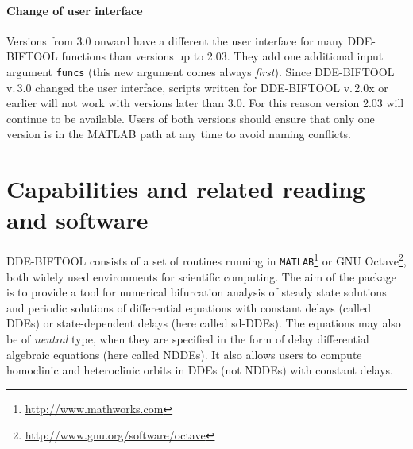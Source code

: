 \documentclass[10pt]{scrartcl}
\newcommand{\DDEBIFCODE}{\textsc{DDE-BIFTOOL}}
\newcommand{\blist}[1]{\mbox{\lstinline!#1!}}
\begin{document}
\paragraph{Change of user interface}
Versions from 3.0 onward have a different the user interface for many
\DDEBIFCODE{} functions than versions up to 2.03. They add one
additional input argument \blist{funcs} (this new argument comes
always \emph{first}).  Since \DDEBIFCODE{} v.\,3.0 changed the user
interface, scripts written for \DDEBIFCODE{} v.\,2.0x or earlier will
not work with versions later than 3.0. For this reason version 2.03
will continue to be available. Users of both versions should ensure
that only one version is in the MATLAB path at any time to avoid
naming conflicts.

\section{Capabilities and related reading and
  software}
\label{sec:intro} {\DDEBIFCODE} consists of a set of routines running
in \texttt{MATLAB}\footnote{\url{http://www.mathworks.com}}
\cite{Mat00} or GNU
Octave\footnote{\url{http://www.gnu.org/software/octave}}, both widely
used environments for scientific computing.  The aim of the package is
to provide a tool for numerical bifurcation analysis of steady state
solutions and periodic solutions of differential equations with
constant delays (called DDEs) or state-dependent delays (here called
sd-DDEs). The equations may also be of \emph{neutral} type, when they
are specified in the form of delay differential algebraic equations
(here called NDDEs). It also allows users to compute homoclinic and
heteroclinic orbits in DDEs (not NDDEs) with constant delays.
\end{document}
